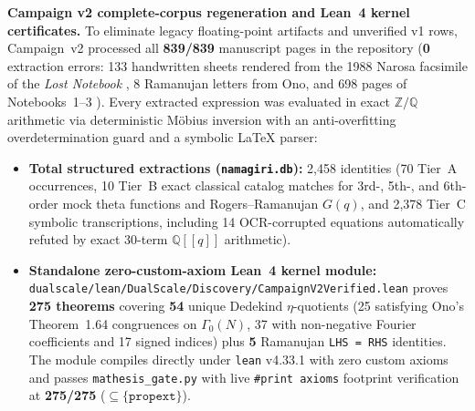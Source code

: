 \documentclass[11pt,a4paper]{article}
\theoremstyle{plain}
\theoremstyle{definition}
\theoremstyle{remark}
\begin{document}
\noindent\textbf{Campaign v2 complete-corpus regeneration and Lean~4 kernel certificates.}
To eliminate legacy floating-point artifacts and unverified v1 rows,
Campaign~v2 processed all \textbf{839/839} manuscript pages in the repository
(\textbf{0} extraction errors: 133 handwritten sheets rendered from the 1988
Narosa facsimile of the \emph{Lost Notebook} \cite{Narosa1988}, 8 Ramanujan
letters from Ono, and 698 pages of Notebooks~1--3 \cite{AndrewsBerndt}).
Every extracted expression was evaluated in exact $\mathbb{Z}/\mathbb{Q}$
arithmetic via deterministic M\"{o}bius inversion with an anti-overfitting
overdetermination guard and a symbolic \LaTeX{} parser:
\begin{itemize}
  \item \textbf{Total structured extractions (\texttt{namagiri.db}):}
    2,458 identities (70 Tier~A occurrences, 10 Tier~B exact classical catalog
    matches for 3rd-, 5th-, and 6th-order mock theta functions and
    Rogers--Ramanujan $G(q)$, and 2,378 Tier~C symbolic transcriptions,
    including 14 OCR-corrupted equations automatically refuted by exact
    30-term $\mathbb{Q}[[q]]$ arithmetic).
  \item \textbf{Standalone zero-custom-axiom Lean~4 kernel module:}
    \texttt{dualscale/lean/DualScale/Discovery/CampaignV2Verified.lean}
    proves \textbf{275 theorems} covering \textbf{54} unique Dedekind
    $\eta$-quotients (25 satisfying Ono's Theorem~1.64 congruences on
    $\Gamma_0(N)$, 37 with non-negative Fourier coefficients and 17 signed
    indices) plus \textbf{5} Ramanujan \texttt{LHS = RHS} identities.
    The module compiles directly under \texttt{lean} v4.33.1 with zero custom
    axioms and passes \texttt{mathesis\_gate.py} with live
    \texttt{\#print axioms} footprint verification at \textbf{275/275}
    ($\subseteq \{\texttt{propext}\}$).
\end{itemize}
\end{document}
